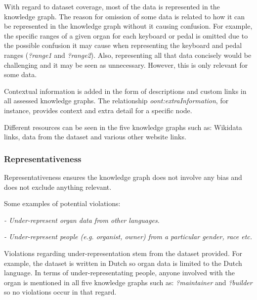 With regard to dataset coverage, most of the data is represented in the knowledge graph. The reason for omission of some data is related to how it can be represented in the knowledge graph without it causing confusion. For example, the specific ranges of a given organ for each keyboard or pedal is omitted due to the possible confusion it may cause when representing the keyboard and pedal ranges (\textit{?range1} and \textit{?range2}). Also, representing all that data concisely would be challenging and it may be seen as unnecessary. However, this is only relevant for some data. 

Contextual information is added in the form of descriptions and custom links in all assessed knowledge graphs. The relationship \textit{oont:extraInformation}, for instance, provides context and extra detail for a specific node. 

Different resources can be seen in the five knowledge graphs such as: Wikidata links, data from the dataset and various other website links. 

\subsubsection{Representativeness}
\hspace{0.5cm} Representativeness ensures the knowledge graph does not involve any bias and does not exclude anything relevant. \cite{knowledgegraphevaulationbook}

\noindent Some examples of potential violations: 

\vspace{-0.1cm}
\begin{displayquote}
    \textit{- Under-represent organ data from other languages.}
\end{displayquote}  
\vspace{-0.6cm}
\begin{displayquote}
     \textit{- Under-represent people (e.g. organist, owner) from a particular gender, race etc. }  
\end{displayquote}
\vspace{-0.1cm}

Violations regarding under-representation stem from the dataset provided. For example, the dataset is written in Dutch so organ data is limited to the Dutch language. In terms of under-representating people, anyone involved with the organ is mentioned in all five knowledge graphs such as: \textit{?maintainer} and \textit{?builder} so no violations occur in that regard.

